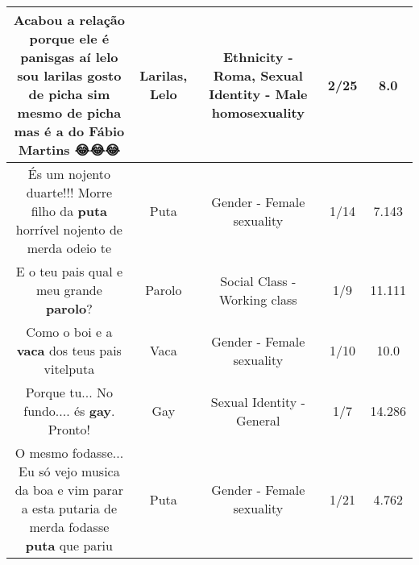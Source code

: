 \documentclass[11pt]{article}
\newlength\mylength
\begin{document}
\begin{center}
\begin{longtable}{|C{.65\mylength}|C{.30\mylength}|C{.12\mylength}|C{.12\mylength}|C{.12\mylength}|}
  \small Acabou a relação porque ele é panisgas aí \textbf{lelo} sou \textbf{larilas} gosto de picha sim mesmo de picha mas é a do Fábio Martins 😂😂😂\normalsize   & Larilas, Lelo & Ethnicity - Roma, Sexual Identity - Male homosexuality & 2/25 & 8.0 \\  \hline
  \small És um nojento duarte!!! Morre filho da \textbf{puta} horrível nojento de merda odeio te\normalsize   & Puta & Gender - Female sexuality & 1/14 & 7.143 \\  \hline
  \small E o teu pais qual e meu grande \textbf{parolo}?\normalsize   & Parolo & Social Class - Working class & 1/9 & 11.111 \\  \hline
  \small Como o boi e a \textbf{vaca} dos teus pais vitelputa\normalsize   & Vaca & Gender - Female sexuality & 1/10 & 10.0 \\  \hline
  \small Porque tu... No fundo.... és \textbf{gay}. Pronto!\normalsize   & Gay & Sexual Identity - General & 1/7 & 14.286 \\  \hline
  \small O mesmo fodasse... Eu só vejo musica da boa e vim parar a esta putaria de merda fodasse \textbf{puta} que pariu\normalsize   & Puta & Gender - Female sexuality & 1/21 & 4.762 \\  \hline
  
\end{longtable}
\end{center}
\end{document}
